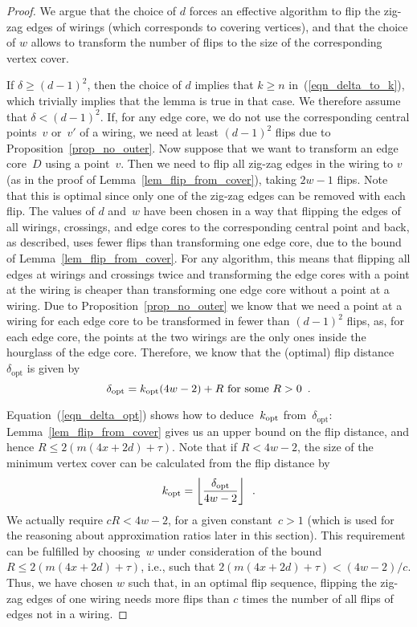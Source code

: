 \documentclass[11pt,a4paper]{article}
\begin{document}
\begin{proof}
We argue that the choice of $d$ forces an effective algorithm to flip the zig-zag edges of wirings (which corresponds to covering vertices), and that the choice of $w$ allows to transform the number of flips to the size of the corresponding vertex cover.

If $\delta \geq (d-1)^2$, then the choice of $d$ implies that $k \geq n$ in~(\ref{eqn_delta_to_k}), which trivially implies that the lemma is true in that case.
We therefore assume that $\delta < (d-1)^2$.
If, for any edge core, we do not use the corresponding central points~$v$ or~$v'$ of a wiring, we need at least $(d-1)^2$ flips due to Proposition~\ref{prop_no_outer}.
Now suppose that we want to transform an edge core~$D$ using a point~$v$.
Then we need to flip all zig-zag edges in the wiring to $v$ (as in the proof of Lemma~\ref{lem_flip_from_cover}), taking $2w-1$ flips.
Note that this is optimal since only one of the zig-zag edges can be removed with each flip.
The values of $d$ and~$w$ have been chosen in a way that flipping the edges of all wirings, crossings, and edge cores to the corresponding central point and back, as described, uses fewer flips than transforming one edge core, due to the bound of Lemma~\ref{lem_flip_from_cover}.
For any algorithm, this means that flipping all edges at wirings and crossings twice and transforming the edge cores with a point at the wiring is cheaper than transforming one edge core without a point at a wiring.
Due to Proposition~\ref{prop_no_outer} we know that we need a point at a wiring for each edge core to be transformed in fewer than $(d-1)^2$ flips, as, for each edge core, the points at the two wirings are the only ones inside the hourglass of the edge core.
Therefore, we know that the (optimal) flip distance $\delta_\mathrm{opt}$ is given by
\begin{equation}\label{eqn_delta_opt}
\delta_\mathrm{opt} = k_{\mathrm{opt}}(4w - 2) + R \text{ for some } R > 0 \enspace .
\end{equation}



Equation~(\ref{eqn_delta_opt}) shows how to deduce~$k_{\mathrm{opt}}$ from~$\delta_\mathrm{opt}$:
Lemma~\ref{lem_flip_from_cover} gives us an upper bound on the flip distance, and hence $R \leq 2(m(4x + 2d) + \tau)$.
Note that if $R < 4w-2$, the size of the minimum vertex cover can be calculated from the flip distance by
\begin{equation*}k_{\mathrm{opt}} = \left \lfloor \frac{\delta_\mathrm{opt}}{4w-2} \right \rfloor \enspace .
\end{equation*}
We actually require $cR < 4w-2$, for a given constant~$c > 1$ (which is used for the reasoning about approximation ratios later in this section).
This requirement can be fulfilled by choosing~$w$ under consideration of the bound $R \leq 2(m(4x + 2d) + \tau)$, i.e., such that $2(m(4x + 2d) + \tau) < (4w-2)/c$.
Thus, we have chosen $w$ such that, in an optimal flip sequence, flipping the zig-zag edges of one wiring needs more flips than $c$ times the number of all flips of edges not in a wiring.


\end{proof}
\end{document}
